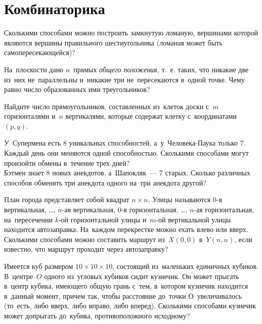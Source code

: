 
\section*{Комбинаторика}


\begin{problems}

\item
Сколькими способами можно построить замкнутую ломаную, вершинами которой
являются вершины правильного шестиугольника
(ломаная может быть самопересекающейся)?

\item
На~плоскости дано $n$~прямых \emph{общего положения,} т.~е. таких, что никакие
две из~них не~параллельны и~никакие три не~пересекаются в~одной точке.
Чему равно число образованных ими треугольников?

\item
Найдите число прямоугольников, составленных из~клеток доски с~$m$ горизонталями
и~$n$ вертикалями, которые содержат клетку с~координатами $(p, q)$.

\item
\subproblem
У~Супермена есть 8 уникальных способностей, а~у~Человека-Паука только 7.
Каждый день они меняются одной способностью.
Сколькими способами могут произойти обмены в~течение трех дней?
\\
\subproblem
Бэтмен знает 8 новых анекдотов, а~Шапокляк~--- 7 старых.
Сколько различных способов обменять три анекдота одного на~три анекдота другой?

\item
План города представляет собой квадрат $n \times n$.
Улицы называются 0-я вертикальная, \ldots, $n$-ая вертикальная,
0-я горизонтальная, \ldots, $n$-ая горизонтальная,
на~пересечении $k$-ой горизонтальной улицы и~$m$-ой вертикальной улицы
находится автозаправка.
На~каждом перекрестке можно ехать влево или вверх.
Сколькими способами можно составить маршрут из~$X (0, 0)$ в~$Y (n, n)$, если
известно, что маршрут проходит через автозаправку?

\item
Имеется куб размером $10 \times 10 \times 10$, состоящий из~маленьких единичных
кубиков.
В~центре~$O$ одного из~угловых кубиков сидит кузнечик.
Он может прыгать в~центр кубика, имеющего общую грань с~тем, в~котором кузнечик
находится в~данный момент, причем так, чтобы расстояние до~точки
О~увеличивалось (то~есть, либо вверх, либо вправо, либо вперед).
Сколькими способами кузнечик может допрыгать до~кубика, противоположного
исходному?


\end{problems}
